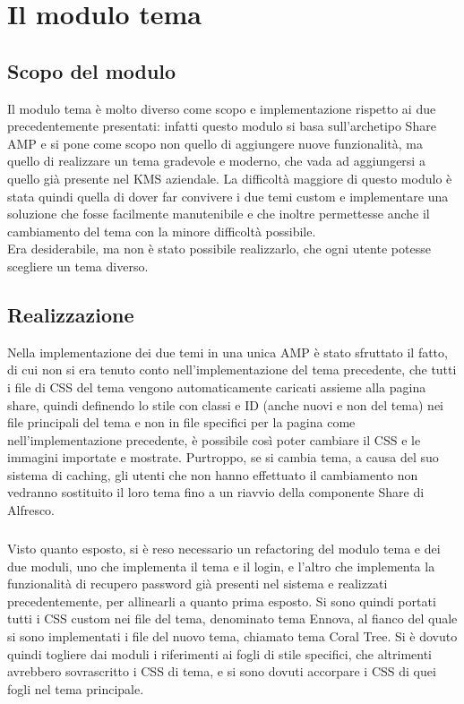 
\chapter{Il modulo tema}
\label{cap:modulo-tema}

\section{Scopo del modulo}
Il modulo tema è molto diverso come scopo e implementazione rispetto ai due precedentemente presentati: infatti questo modulo si basa sull'archetipo Share AMP e si pone come scopo non quello di aggiungere nuove funzionalità, ma quello di realizzare un tema gradevole e moderno, che vada ad aggiungersi a quello già presente nel \gls{KMS} aziendale. La difficoltà maggiore di questo modulo è stata quindi quella di dover far convivere i due temi custom e implementare una soluzione che fosse facilmente manutenibile e che inoltre permettesse anche il cambiamento del tema con la minore difficoltà possibile.\\
Era desiderabile, ma non è stato possibile realizzarlo, che ogni utente potesse scegliere un tema diverso.
\section{Realizzazione}
Nella implementazione dei due temi in una unica AMP è stato sfruttato il fatto, di cui non si era tenuto conto nell’implementazione del tema precedente, che tutti i file di CSS del tema vengono automaticamente caricati assieme alla pagina share, quindi definendo lo stile con classi e ID (anche nuovi e non del tema) nei file principali del tema e non in file specifici per la pagina come nell'implementazione precedente, è possibile così poter cambiare il CSS e le immagini importate e mostrate.
Purtroppo, se si cambia tema, a causa del suo sistema di caching, gli utenti che non hanno effettuato il cambiamento non vedranno sostituito il loro tema fino a un riavvio della componente Share di Alfresco.
\paragraph{}Visto quanto esposto, si è reso necessario un refactoring del modulo tema e dei due moduli, uno che implementa il tema e il login, e l'altro che implementa la funzionalità di recupero password già presenti nel sistema e realizzati precedentemente, per allinearli a quanto prima esposto. Si sono quindi portati tutti i CSS custom nei file del tema, denominato tema Ennova, al fianco del quale si sono implementati i file del nuovo tema, chiamato tema Coral Tree. Si è dovuto quindi togliere dai moduli i riferimenti ai fogli di stile specifici, che altrimenti avrebbero sovrascritto i CSS di tema, e si sono dovuti accorpare i CSS di quei fogli nel tema principale.
